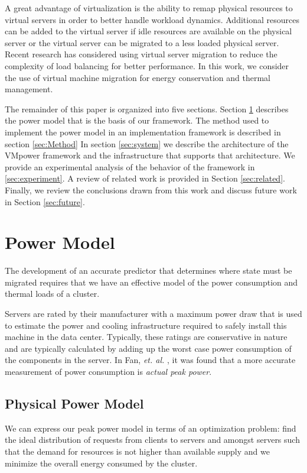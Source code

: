 \documentclass[times, 10pt,twocolumn]{article}
\begin{document}
A great advantage of virtualization is the ability to remap physical resources
to virtual servers in order to better handle workload dynamics.  Additional
resources can be added to the virtual server if idle resources are available
on the physical server or the virtual server can be migrated to a less loaded
physical server.  Recent research \cite{Grit2006} \cite{Wood2007}
\cite{Govindan2007} has considered using virtual server migration to reduce
the complexity of load balancing for better performance.  In this work, we
consider the use of virtual machine migration for energy conservation and
thermal management.

The remainder of this paper is organized into five sections.  Section
\ref{sec:power} describes the power model that is the basis of our
framework. The method used to implement the power model in an
implementation framework is described in section \ref{sec:Method} In
section \ref{sec:system} we describe the architecture of the VMpower
framework and the infrastructure that supports that architecture.  We
provide an experimental analysis of the behavior of the framework in
\ref{sec:experiment}. A review of related work is provided in Section
\ref{sec:related}.  Finally, we review the conclusions drawn from this
work and discuss future work in Section \ref{sec:future}.

\section{Power Model}
\label{sec:power}
The development of an accurate predictor that determines where state must be
migrated requires that we have an effective model of the power consumption and
thermal loads of a cluster. 
 
Servers are rated by their manufacturer with a maximum power draw that is used
to estimate the power and cooling infrastructure required to safely install
this machine in the data center.   Typically, these ratings are conservative
in nature and are typically calculated by adding up the worst case power
consumption of the components in the server.  In Fan, \textit{et. al.}
\cite{Fan2007}, it was found that a more accurate measurement of power
consumption is \textit{actual peak power}.

\subsection{Physical Power Model}
\label{sec:powerphysical}
We can express our peak power model in terms of an optimization problem: find
the ideal distribution of requests from clients to servers and amongst servers
such that the demand for resources is not higher than available supply and we
minimize the overall energy consumed by the cluster. \cite{Heath2005}
\end{document}
